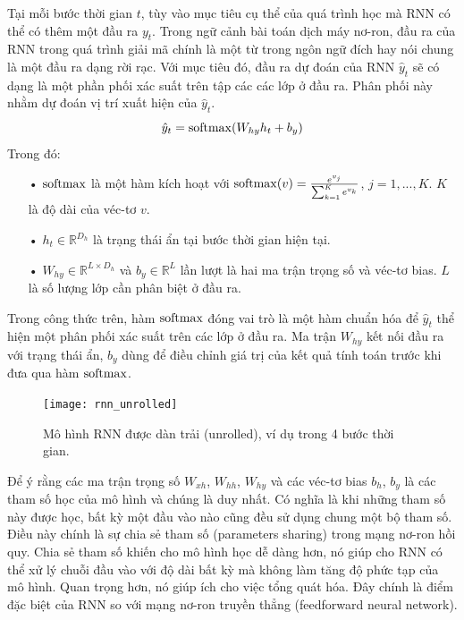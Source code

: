 Tại mỗi bước thời gian $t$, tùy vào mục tiêu cụ thể của quá trình học mà RNN có thể có thêm một đầu ra $y_t$. Trong ngữ cảnh bài toán dịch máy nơ-ron, đầu ra của RNN trong quá trình giải mã chính là một từ trong ngôn ngữ đích hay nói chung là một đầu ra dạng rời rạc. Với mục tiêu đó, đầu ra dự đoán của RNN $\hat{y}_t$ sẽ có dạng là một phần phối xác suất trên tập các các lớp ở đầu ra. Phân phối này nhằm dự đoán vị trí xuất hiện của $\hat{y}_t$.
\begin{equation} \label{rnnOuputSoftmaxDistribution}
	\hat{y}_t = \mathrm{softmax}(W_{hy}h_t + b_y)
\end{equation}
Trong đó:
\begin{itemize}
	\item[•] $\mathrm{softmax}$ là một hàm kích hoạt với $\mathrm{softmax}(v) = \frac{e^{v_j}}{\sum_{k=1}^{K}e^{v_k}}$, $j = 1,...,K$. $K$ là độ dài của véc-tơ $v$.
	\item[•] $h_{t} \in \mathbb{R}^{D_h}$ là trạng thái ẩn tại bước thời gian hiện tại.
	\item[•] $W_{hy} \in \mathbb{R}^{L \times D_h}$ và $b_y \in \mathbb{R}^L$ lần lượt là hai ma trận trọng số và véc-tơ bias. $L$ là số lượng lớp cần phân biệt ở đầu ra.
\end{itemize}

Trong công thức trên, hàm $\mathrm{softmax}$ đóng vai trò là một hàm chuẩn hóa để $\hat{y}_t$ thể hiện một phân phối xác suất trên các lớp ở đầu ra. Ma trận $W_{hy}$ kết nối đầu ra với trạng thái ẩn, $b_y$ dùng để điều chỉnh giá trị của kết quả tính toán trước khi đưa qua hàm $\mathrm{softmax}$.

\begin{figure}
	\centering
	\texttt{[image: rnn\_unrolled]}
	\caption[Mô hình RNN dạng dàn trải]{Mô hình RNN được dàn trải (unrolled), ví dụ trong 4 bước thời gian.}
	\label{fig_rnn_unrolled}
\end{figure}

Để ý rằng các ma trận trọng số $W_{xh}$, $W_{hh}$, $W_{hy}$ và các véc-tơ bias $b_h$, $b_y$ là các tham số học của mô hình và chúng là duy nhất. Có nghĩa là khi những tham số này được học, bất kỳ một đầu vào nào cũng đều sử dụng chung một bộ tham số. Điều này chính là sự chia sẻ tham số (parameters sharing) trong mạng nơ-ron hồi quy. Chia sẻ tham số khiến cho mô hình học dễ dàng hơn, nó giúp cho RNN có thể xử lý chuỗi đầu vào với độ dài bất kỳ mà không làm tăng độ phức tạp của mô hình. Quan trọng hơn, nó giúp ích cho việc tổng quát hóa. Đây chính là điểm đặc biệt của RNN so với mạng nơ-ron truyền thẳng (feedforward neural network).

